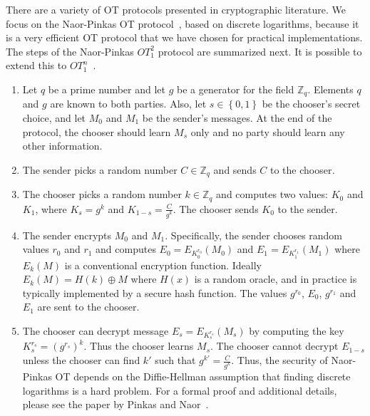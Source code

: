 There are a variety of OT protocols presented in cryptographic literature.
We focus on the Naor-Pinkas OT protocol~\cite{NaorPinkas99}, based
on discrete logarithms, because it is a very efficient OT protocol
that we have chosen for practical implementations. 
The steps of the Naor-Pinkas $OT_{1}^{2}$ protocol are summarized next.
It is possible to extend this to $OT_{1}^{n}$~\cite{NaorPinkas99}.
\begin{enumerate}
\item Let $q$ be a prime number and let $g$ be a generator for the field
$\mathbb{Z}_{q}$.  Elements $q$ and $g$ are known to both parties. Also,
let $s\in\left\{ 0,1\right\} $ be the chooser's secret choice, and
let $M_{0}$ and $M_{1}$ be the sender's messages. At the end of
the protocol, the chooser should learn $M_{s}$ only and no party
should learn any other information.
\item The sender picks a random number $C\in\mathbb{Z}_{q}$ and sends $C$
to the chooser\emph{.}
\item The chooser picks a random number $k\in\mathbb{Z}_{q}$ and computes
two values: $K_{0}$ and $K_{1}$, where $K_{s}=g^{k}$ and $K_{1-s}=\frac{C}{g^{k}}$.
The chooser sends $K_{0}$ to the sender.
\item The sender encrypts $M_{0}$ and $M_{1}$. Specifically, the sender
chooses random values $r_{0}$ and $r_{1}$ and computes $E_{0}=E_{K_{0}^{r_{0}}}\left(M_{0}\right)$
and $E_{1}=E_{K_{1}^{r_{1}}}\left(M_{1}\right)$ where $E_{k}\left(M\right)$
is a conventional encryption function. Ideally $E_{k}\left(M\right)=H\left(k\right)\oplus M$
where $H\left(x\right)$ is a random oracle, and in practice is typically
implemented by a secure hash function. The values $g^{r_{0}}$, $E_{0}$,
$g^{r_{1}}$ and $E_{1}$ are sent to the chooser.
\item The chooser can decrypt message $E_{s}=E_{K_{s}^{r_{s}}}\left(M_{s}\right)$
by computing the key $K_{s}^{r_{s}}=\left(g^{r_{s}}\right)^{k}$.
Thus the chooser learns $M_{s}$. The chooser cannot decrypt $E_{1-s}$
unless the chooser can find $k'$ such that $g^{k'}=\frac{C}{g^{k}}$.
Thus, the security of Naor-Pinkas OT depends on the Diffie-Hellman
assumption that finding discrete logarithms is a hard problem.
For a formal proof and additional details, please see the paper by 
Pinkas and Naor~\cite{NaorPinkas99}.
\end{enumerate}

